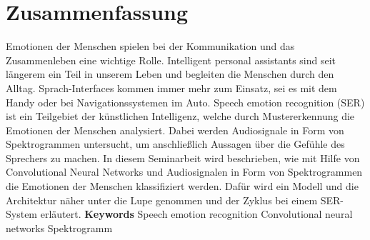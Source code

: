 \chapter*{Zusammenfassung}
Emotionen der Menschen spielen bei der Kommunikation und das Zusammenleben eine wichtige Rolle.
Intelligent personal assistants sind seit längerem ein Teil in unserem Leben und begleiten die Menschen durch den Alltag. Sprach-Interfaces kommen immer mehr zum Einsatz, sei es mit dem Handy oder bei Navigationssystemen im Auto.  Speech emotion recognition (SER) ist ein Teilgebiet der künstlichen Intelligenz, welche durch Mustererkennung die Emotionen der Menschen analysiert. Dabei werden Audiosignale in Form von Spektrogrammen untersucht, um anschließlich Aussagen über die Gefühle des Sprechers zu machen. In diesem Seminarbeit wird beschrieben, wie mit Hilfe von Convolutional Neural Networks und Audiosignalen in Form von Spektrogrammen die Emotionen der Menschen klassifiziert werden. Dafür wird ein Modell und die Architektur näher unter die Lupe genommen und der Zyklus bei einem SER-System erläutert.
\newline \newline\newline
\textbf{Keywords} Speech emotion recognition \textbullet Convolutional neural networks \textbullet Spektrogramm
